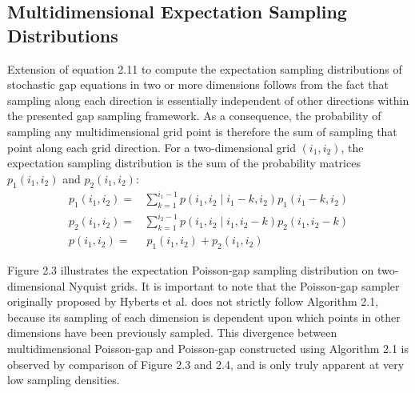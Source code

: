 \subsection{Multidimensional Expectation Sampling Distributions}

\begin{doublespace}
Extension of equation 2.11 to compute the expectation sampling distributions
of stochastic gap equations in two or more dimensions follows from the fact
that sampling along each direction is essentially independent of other
directions within the presented gap sampling framework. As a consequence,
the probability of sampling any multidimensional grid point is therefore the
sum of sampling that point along each grid direction. For a two-dimensional
grid $(i_1,i_2)$, the expectation sampling distribution is the sum of the
probability matrices $p_1(i_1,i_2)$ and $p_2(i_1,i_2)$:
\begin{align}
p_1(i_1,i_2) =& \sum_{k=1}^{i_1-1} p(i_1,i_2 \mid i_1-k,i_2) p_1(i_1-k,i_2)
 \nonumber \\
p_2(i_1,i_2) =& \sum_{k=1}^{i_2-1} p(i_1,i_2 \mid i_1,i_2-k) p_2(i_1,i_2-k)
 \nonumber \\
p(i_1,i_2) =&\: p_1(i_1,i_2) + p_2(i_1,i_2)
\end{align}

Figure 2.3 illustrates the expectation Poisson-gap sampling distribution on
two-dimensional Nyquist grids. It is important to note that the Poisson-gap
sampler originally proposed by Hyberts et al. does not strictly follow
Algorithm 2.1, because its sampling of each dimension is dependent upon
which points in other dimensions have been previously sampled. This divergence
between multidimensional Poisson-gap and Poisson-gap constructed using
Algorithm 2.1 is observed by comparison of Figure 2.3 and 2.4, and is only
truly apparent at very low sampling densities.
\end{doublespace}

